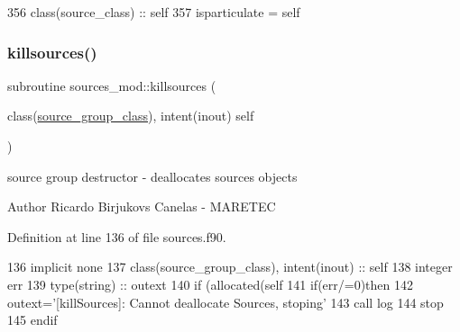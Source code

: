 \begin{DoxyCode}
356     \textcolor{keywordtype}{class}(source\_class) :: self
357     isparticulate = self%
\end{DoxyCode}
\mbox{\label{namespacesources__mod_aee745aa084adcfa41ecfc3469b90aa8e}} 
\subsubsection{\texorpdfstring{killsources()}{killsources()}}
{\footnotesize\ttfamily subroutine sources\+\_\+mod\+::killsources (\begin{DoxyParamCaption}\item[{class(\mbox{\hyperlink{structsources__mod_1_1source__group__class}{source\+\_\+group\+\_\+class}}), intent(inout)}]{self }\end{DoxyParamCaption})\hspace{0.3cm}{\ttfamily [private]}}



source group destructor -\/ deallocates sources objects 

\begin{DoxyAuthor}{Author}
Ricardo Birjukovs Canelas -\/ M\+A\+R\+E\+T\+EC 
\end{DoxyAuthor}


Definition at line 136 of file sources.\+f90.


\begin{DoxyCode}
136     \textcolor{keywordtype}{implicit none}
137     \textcolor{keywordtype}{class}(source\_group\_class), \textcolor{keywordtype}{intent(inout)} :: self
138     \textcolor{keywordtype}{integer} err
139     \textcolor{keywordtype}{type}(string) :: outext
140     \textcolor{keywordflow}{if} (\textcolor{keyword}{allocated}(self%
141     \textcolor{keywordflow}{if}(err/=0)\textcolor{keywordflow}{then}
142         outext=\textcolor{stringliteral}{'[killSources]: Cannot deallocate Sources, stoping'}
143         \textcolor{keyword}{call }log%
144         stop
145 \textcolor{keywordflow}{    endif}
\end{DoxyCode}
\mbox{\label{namespacesources__mod_a683ca7e4aca7a0050aad9f506569fca9}} 
